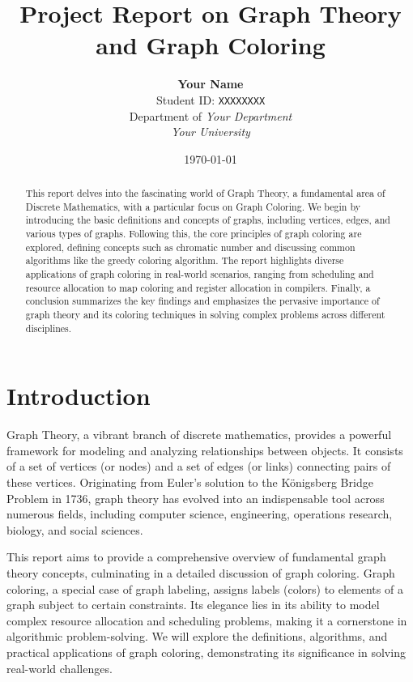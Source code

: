\documentclass[11pt, a4paper]{article}
\title{\textbf{Project Report on Graph Theory and Graph Coloring}}
\author{
    \textbf{Your Name} \\
    Student ID: \texttt{XXXXXXXX} \\
    Department of \textit{Your Department} \\
    \textit{Your University}
}
\date{\today} %
\begin{document}
\maketitle %

\thispagestyle{empty} %
\newpage

\begin{abstract}
This report delves into the fascinating world of Graph Theory, a fundamental area of Discrete Mathematics, with a particular focus on Graph Coloring. We begin by introducing the basic definitions and concepts of graphs, including vertices, edges, and various types of graphs. Following this, the core principles of graph coloring are explored, defining concepts such as chromatic number and discussing common algorithms like the greedy coloring algorithm. The report highlights diverse applications of graph coloring in real-world scenarios, ranging from scheduling and resource allocation to map coloring and register allocation in compilers. Finally, a conclusion summarizes the key findings and emphasizes the pervasive importance of graph theory and its coloring techniques in solving complex problems across different disciplines.
\end{abstract}

\newpage
\tableofcontents %
\newpage

\section{Introduction}
Graph Theory, a vibrant branch of discrete mathematics, provides a powerful framework for modeling and analyzing relationships between objects. It consists of a set of vertices (or nodes) and a set of edges (or links) connecting pairs of these vertices. Originating from Euler's solution to the Königsberg Bridge Problem in 1736, graph theory has evolved into an indispensable tool across numerous fields, including computer science, engineering, operations research, biology, and social sciences.

This report aims to provide a comprehensive overview of fundamental graph theory concepts, culminating in a detailed discussion of graph coloring. Graph coloring, a special case of graph labeling, assigns labels (colors) to elements of a graph subject to certain constraints. Its elegance lies in its ability to model complex resource allocation and scheduling problems, making it a cornerstone in algorithmic problem-solving. We will explore the definitions, algorithms, and practical applications of graph coloring, demonstrating its significance in solving real-world challenges.
\end{document}
